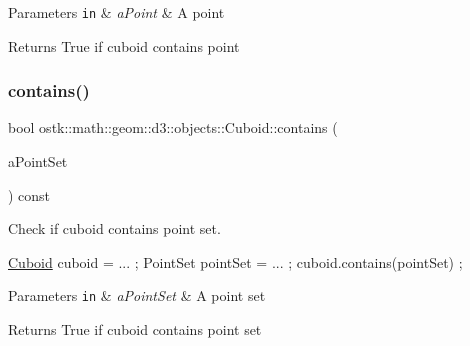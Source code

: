 \begin{DoxyParams}[1]{Parameters}
\mbox{\tt in}  & {\em a\+Point} & A point \\
\hline
\end{DoxyParams}
\begin{DoxyReturn}{Returns}
True if cuboid contains point 
\end{DoxyReturn}
\mbox{\label{classostk_1_1math_1_1geom_1_1d3_1_1objects_1_1_cuboid_ac2f8d6ab7827fd2c8c088ef69492aa2c}} 
\subsubsection{\texorpdfstring{contains()}{contains()}\hspace{0.1cm}{\footnotesize\ttfamily [2/3]}}
{\footnotesize\ttfamily bool ostk\+::math\+::geom\+::d3\+::objects\+::\+Cuboid\+::contains (\begin{DoxyParamCaption}\item[{const \hyperlink{classostk_1_1math_1_1geom_1_1d3_1_1objects_1_1_point_set}{Point\+Set} \&}]{a\+Point\+Set }\end{DoxyParamCaption}) const}



Check if cuboid contains point set. 


\begin{DoxyCode}
\hyperlink{classostk_1_1math_1_1geom_1_1d3_1_1objects_1_1_cuboid_a1da071d7cbb0a694348628f098f77c5b}{Cuboid} cuboid = ... ;
PointSet pointSet = ... ;
cuboid.contains(pointSet) ;
\end{DoxyCode}



\begin{DoxyParams}[1]{Parameters}
\mbox{\tt in}  & {\em a\+Point\+Set} & A point set \\
\hline
\end{DoxyParams}
\begin{DoxyReturn}{Returns}
True if cuboid contains point set 
\end{DoxyReturn}
\mbox{\label{classostk_1_1math_1_1geom_1_1d3_1_1objects_1_1_cuboid_ac04afa98ba39500f4e476a57a92a554e}} 
